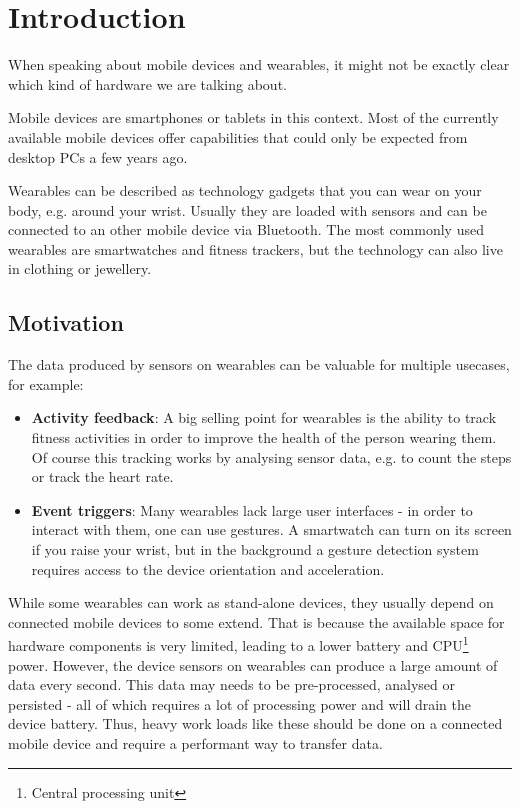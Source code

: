 \section{Introduction}
\label{sec:intro}

When speaking about mobile devices and wearables, it might not be exactly clear which kind of hardware we are talking about.

Mobile devices are smartphones or tablets in this context. Most of the currently available mobile devices offer capabilities that could only be expected from desktop PCs a few years ago.

Wearables can be described as technology gadgets that you can wear on your body, e.g. around your wrist.
Usually they are loaded with sensors and can be connected to an other mobile device via Bluetooth.
The most commonly used wearables are smartwatches and fitness trackers, but the technology can also live in clothing or jewellery.


\subsection{Motivation}
\label{sec:intro:motivation}

The data produced by sensors on wearables can be valuable for multiple usecases, for example:
\begin{itemize}[noitemsep]
	\item \textbf{Activity feedback}:
	A big selling point for wearables is the ability to track fitness activities in order to improve the health of the person wearing them.
	Of course this tracking works by analysing sensor data, e.g. to count the steps or track the heart rate.
	\item \textbf{Event triggers}:
	Many wearables lack large user interfaces - in order to interact with them, one can use gestures.
	A smartwatch can turn on its screen if you raise your wrist, but in the background a gesture detection system requires access to the device orientation and acceleration.
\end{itemize}

While some wearables can work as stand-alone devices, they usually depend on connected mobile devices to some extend.
That is because the available space for hardware components is very limited, leading to a lower battery and CPU\footnote{Central processing unit} power.
However, the device sensors on wearables can produce a large amount of data every second.
This data may needs to be pre-processed, analysed or persisted - all of which requires a lot of processing power and will drain the device battery.
Thus, heavy work loads like these should be done on a connected mobile device and require a performant way to transfer data.

